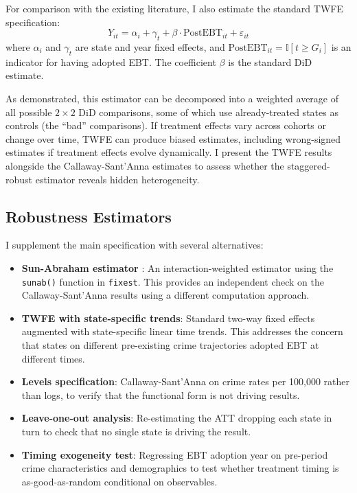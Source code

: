 \documentclass[12pt]{article}
\newcommand{\ind}{\mathbb{I}}
\begin{document}
For comparison with the existing literature, I also estimate the standard TWFE specification:
\begin{equation}
Y_{it} = \alpha_i + \gamma_t + \beta \cdot \text{PostEBT}_{it} + \varepsilon_{it}
\end{equation}
where $\alpha_i$ and $\gamma_t$ are state and year fixed effects, and $\text{PostEBT}_{it} = \ind[t \geq G_i]$ is an indicator for having adopted EBT. The coefficient $\beta$ is the standard DiD estimate.

As \citet{goodman2021difference} demonstrated, this estimator can be decomposed into a weighted average of all possible $2 \times 2$ DiD comparisons, some of which use already-treated states as controls (the ``bad'' comparisons). If treatment effects vary across cohorts or change over time, TWFE can produce biased estimates, including wrong-signed estimates if treatment effects evolve dynamically. I present the TWFE results alongside the Callaway-Sant'Anna estimates to assess whether the staggered-robust estimator reveals hidden heterogeneity.

\subsection{Robustness Estimators}

I supplement the main specification with several alternatives:

\begin{itemize}
\item \textbf{Sun-Abraham estimator} \citep{sun2021estimating}: An interaction-weighted estimator using the \texttt{sunab()} function in \texttt{fixest}. This provides an independent check on the Callaway-Sant'Anna results using a different computation approach.
\item \textbf{TWFE with state-specific trends}: Standard two-way fixed effects augmented with state-specific linear time trends. This addresses the concern that states on different pre-existing crime trajectories adopted EBT at different times.
\item \textbf{Levels specification}: Callaway-Sant'Anna on crime rates per 100,000 rather than logs, to verify that the functional form is not driving results.
\item \textbf{Leave-one-out analysis}: Re-estimating the ATT dropping each state in turn to check that no single state is driving the result.
\item \textbf{Timing exogeneity test}: Regressing EBT adoption year on pre-period crime characteristics and demographics to test whether treatment timing is as-good-as-random conditional on observables.
\end{itemize}
\end{document}
